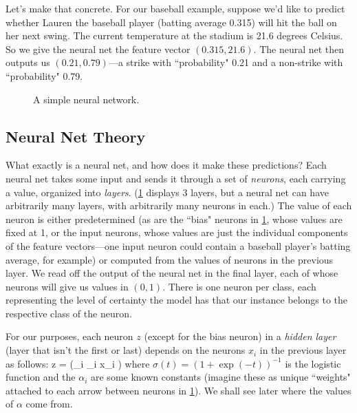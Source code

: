 \documentclass[10pt]{article}
\begin{document}
Let's make that concrete.
For our baseball example, suppose we'd like to predict whether Lauren the baseball player (batting average 0.315) will hit the ball on her next swing.
The current temperature at the stadium is 21.6 degrees Celsius.
So we give the neural net the feature vector $(0.315, 21.6)$.
The neural net then outputs us $(0.21, 0.79)$---a strike with ``probability" 0.21 and a non-strike with ``probability" 0.79.

\begin{figure}[htbp]
\centering

\caption{A simple neural network.}
\label{fig:neuralnet}
\end{figure}


\subsection{Neural Net Theory}

What exactly is a neural net, and how does it make these predictions?
Each neural net takes some input and sends it through a set of \emph{neurons}, each carrying a value, organized into \emph{layers}.
(\cref{fig:neuralnet} displays 3 layers, but a neural net can have arbitrarily many layers, with arbitrarily many neurons in each.)
The value of each neuron is either predetermined (as are the ``bias" neurons in \cref{fig:neuralnet}, whose values are fixed at 1, or the input neurons, whose values are just the individual components of the feature vectors---one input neuron could contain a baseball player's batting average, for example) or computed from the values of neurons in the previous layer.
We read off the output of the neural net in the final layer, each of whose neurons will give us values in $(0, 1)$. There is one neuron per class, each representing the level of certainty the model has that our instance belongs to the respective class of the neuron.

For our purposes, each neuron $z$ (except for the bias neuron) in a \emph{hidden layer} (layer that isn't the first or last) depends on the neurons $x_i$ in the previous layer as follows:
\beq
\label{eq:hiddenlayer}
z = \sigma\left(\sum_i \alpha_i x_i \right)
\eeq
where $\sigma(t) = (1 + \exp(-t))^{-1}$ is the logistic function and the $\alpha_i$ are some known constants (imagine these as unique ``weights" attached to each arrow between neurons in \cref{fig:neuralnet}).
We shall see later where the values of $\alpha$ come from.
\end{document}
